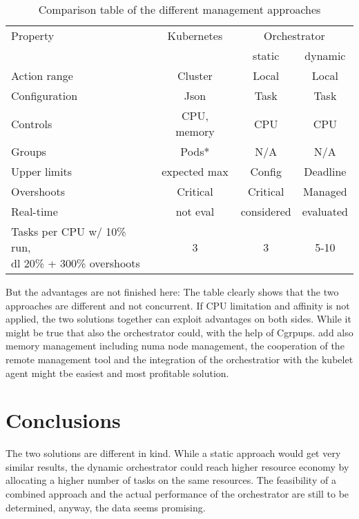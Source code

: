 \documentclass[]{scrartcl}
\begin{document}
\begin{table}[ht]
	\centering
	\begin{tabular}{l c c c}
		Property & Kubernetes & \multicolumn{2}{c}{Orchestrator} \\
		& & static & dynamic \\
		\toprule
		Action range & Cluster & Local & Local \\
		Configuration & Json & Task & Task \\
		\midrule
		Controls & CPU, memory & CPU & CPU \\
		Groups & Pods* & N/A & N/A\\
		\midrule
		Upper limits & expected max & Config & Deadline \\
		Overshoots & Critical & Critical & Managed \\
		Real-time & not eval & considered & evaluated \\
		\midrule
		\shortstack{Tasks per CPU w/ 10\% run,\\
		 dl 20\% + 300\% overshoots} & 3 & 3 & 5-10\\		
		\bottomrule
	\end{tabular}
	\caption{Comparison table of the different management approaches}
	\label{tab:approach}
\end{table}

But the advantages are not finished here: 
The table clearly shows that the two approaches are different and not concurrent. If CPU limitation and affinity is not applied, the two solutions together can exploit advantages on both sides. While it might be true that also the orchestrator could, with the help of Cgrpups. add also memory management including numa node management, the cooperation of the remote management tool and the integration of the orchestratior with the kubelet agent might tbe easiest and most profitable solution. 

\section{Conclusions}

The two solutions are different in kind. While a static approach would get very similar results, the dynamic orchestrator could reach higher resource economy by allocating a higher number of tasks on the same resources.
The feasibility of a combined approach and the actual performance of the orchestrator are still to be determined, anyway, the data seems promising.
\end{document}
